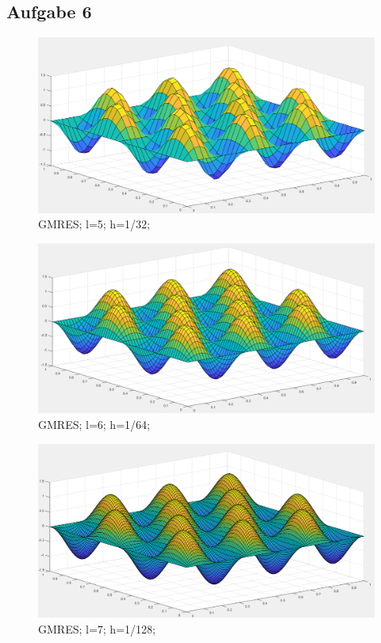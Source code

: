 \documentclass{article}
\begin{document}
\subsection{Aufgabe 6}
\begin{figure}
	\includegraphics[width=\linewidth]{Aufgaben-Ressourcen/A6L5M3N2.png} 
		\caption{GMRES; l=5; h=1/32;}
		\label{A6L5}
\end{figure}
\begin{figure}
	\includegraphics[width=\linewidth]{Aufgaben-Ressourcen/A6L6M3N2.png} 
		\caption{GMRES; l=6; h=1/64;}
		\label{A6L6}
\end{figure}
\begin{figure}
	\includegraphics[width=\linewidth]{Aufgaben-Ressourcen/A6L7M3N2.png}
		\caption{GMRES; l=7; h=1/128;}
		\label{A6L7}
\end{figure}
\end{document}
